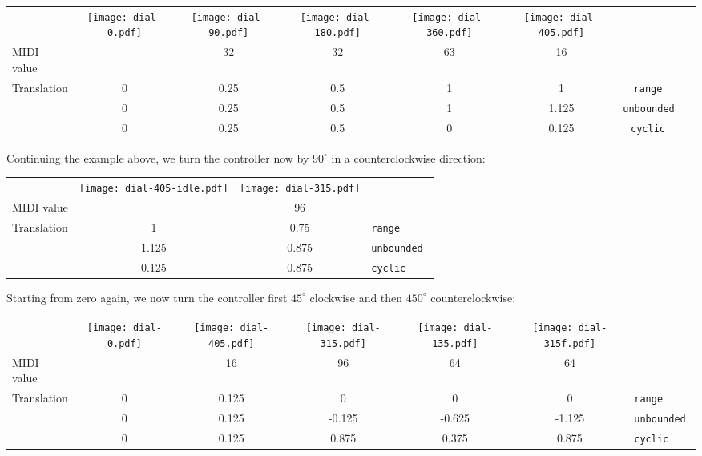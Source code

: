 \documentclass[11pt,a4paper]{article}
\newenvironment{expose}{\vskip3mm\qquad\begin{raggedright}}{%
\end{raggedright}\vskip3mm}
\begin{document}
\begin{expose}
\begin{tabular}{lccccccl}
  \raisebox{6mm}{User input} &
  \texttt{[image: dial-0.pdf]} &
  \texttt{[image: dial-90.pdf]} &
  \texttt{[image: dial-180.pdf]} &
  \texttt{[image: dial-360.pdf]} &
  \texttt{[image: dial-405.pdf]} \\
  \cmidrule(r){1-6}
  MIDI value &
  & 32 & 32 & 63 & 16 \\
  \midrule
  Translation
  & 0 & 0.25 & 0.5 & 1 & 1 & \tt range \\
  & 0 & 0.25 & 0.5 & 1 & 1.125 & \tt unbounded \\
  & 0 & 0.25 & 0.5 & 0 & 0.125 & \tt cyclic \\
\end{tabular}
\end{expose}

Continuing the example above, we turn the controller now by
$90^\circ$ in a counterclockwise direction:

\begin{expose}
\begin{tabular}{lccl}
  \raisebox{6mm}{User input} &
  \texttt{[image: dial-405-idle.pdf]} &
  \texttt{[image: dial-315.pdf]} \\
  \cmidrule(r){1-3}
  MIDI value &
  & 96 \\
  \midrule
  Translation
  & 1 & 0.75 & \tt range \\
  & 1.125 & 0.875 & \tt unbounded \\
  & 0.125 & 0.875 & \tt cyclic \\
\end{tabular}
\end{expose}

Starting from zero again, we now turn the controller first
$45^\circ$ clockwise and then $450^\circ$ counterclockwise:

\begin{expose}
\begin{tabular}{lcccccl}
  \raisebox{6mm}{User input} &
  \texttt{[image: dial-0.pdf]} &
  \texttt{[image: dial-405.pdf]} &
  \texttt{[image: dial-315.pdf]} &
  \texttt{[image: dial-135.pdf]} &
  \texttt{[image: dial-315f.pdf]} \\
  \cmidrule(r){1-6}
  MIDI value &
  & 16 & 96 & 64 & 64 \\
  \midrule
  Translation
  & 0 & 0.125 & 0 & 0 & 0 & \tt range \\
  & 0 & 0.125 & -0.125 & -0.625 & -1.125 & \tt unbounded \\
  & 0 & 0.125 & 0.875 & 0.375 & 0.875 & \tt cyclic \\
\end{tabular}
\end{expose}
\end{document}
